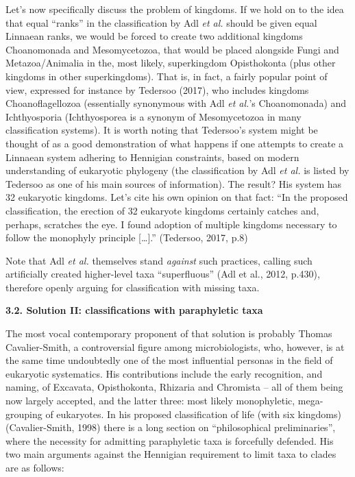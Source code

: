 \documentclass[a4paper]{article}
\begin{document}
Let’s now specifically discuss the problem of kingdoms. If we hold on to the idea that equal “ranks” in the
classification by Adl \textit{et al.} should be given equal Linnaean ranks, we would be forced to create two additional
kingdoms Choanomonada and Mesomycetozoa, that would be placed alongside Fungi and Metazoa/Animalia in the, most likely,
superkingdom Opisthokonta (plus other kingdoms in other superkingdoms). That is, in fact, a fairly popular point of
view, expressed for instance by Tedersoo \label{ref:RNDXAoIqIPayD}(2017), who includes kingdoms Choanoflagellozoa
(essentially synonymous with Adl \textit{et al.}’s Choanomonada) and Ichthyosporia (Ichthyosporea is a synonym of
Mesomycetozoa in many classification systems). It is worth noting that Tedersoo’s system might be thought of as a good
demonstration of what happens if one attempts to create a Linnaean system adhering to Hennigian constraints, based on
modern understanding of eukaryotic phylogeny (the classification by Adl \textit{et al.} is listed by Tedersoo as one of
his main sources of information). The result? His system has 32 eukaryotic kingdoms. Let’s cite his own opinion on that
fact: “In the proposed classification, the erection of 32 eukaryote kingdoms certainly catches and, perhaps, scratches
the eye. I found adoption of multiple kingdoms necessary to follow the monophyly principle […].”
\label{ref:RNDP7J0D4JTk6}(Tedersoo, 2017, p.8)

Note that Adl \textit{et al. }themselves stand \textit{against }such practices, calling such artificially created
higher-level taxa “superfluous”  \label{ref:RNDTkKC0gomXM}(Adl et al., 2012, p.430), therefore openly arguing for
classification with missing taxa.

{\bfseries
3.2. Solution II: classifications with paraphyletic taxa}

The most vocal contemporary proponent of that solution is probably Thomas Cavalier-Smith, a controversial figure among
microbiologists, who, however, is at the same time undoubtedly one of the most influential personas in the field of
eukaryotic systematics. His contributions include the early recognition, and naming, of Excavata, Opisthokonta,
Rhizaria and Chromista – all of them being now largely accepted, and the latter three: most likely monophyletic,
mega-grouping of eukaryotes. In his proposed classification of life (with six kingdoms)
\label{ref:RNDScaXMIFqT5}(Cavalier-Smith, 1998) there is a long section on “philosophical preliminaries”, where the
necessity for admitting paraphyletic taxa is forcefully defended. His two main arguments against the Hennigian
requirement to limit taxa to clades are as follows:
\end{document}
